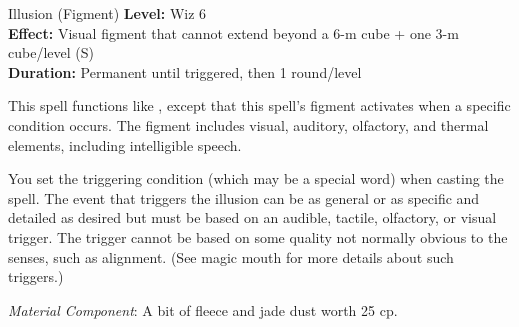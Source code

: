 {Illusion (Figment)}
{
	\textbf{Level:}
	Wiz 6\\
	\textbf{Effect:}
	Visual figment that cannot extend beyond a 6-m cube + one 3-m cube/level (S)\\
	\textbf{Duration:}
	Permanent until triggered, then 1 round/level\\
}
{
	This spell functions like , except that this spell's figment activates when a specific condition occurs. The figment includes visual, auditory, olfactory, and thermal elements, including intelligible speech.

	You set the triggering condition (which may be a special word) when casting the spell. The event that triggers the illusion can be as general or as specific and detailed as desired but must be based on an audible, tactile, olfactory, or visual trigger. The trigger cannot be based on some quality not normally obvious to the senses, such as alignment. (See magic mouth for more details about such triggers.)

	\textit{Material Component}:
	A bit of fleece and jade dust worth 25 cp.

}
